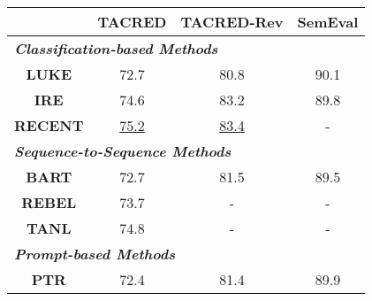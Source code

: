 \begin{table}[]
\centering
\setlength{\tabcolsep}{1.3mm}
\begin{tabular}{cccc}
\toprule[1.5pt]
\multicolumn{1}{l|}{}                         & \multicolumn{1}{l|}{\textbf{TACRED}}     & \multicolumn{1}{l|}{\textbf{TACRED-Rev}} & \multicolumn{1}{l}{\textbf{SemEval}} \\ \hline
\multicolumn{4}{l}{\textit{\textbf{Classification-based Methods}}}                                                                                                                 \\ \hline
\multicolumn{1}{c|}{\textbf{LUKE}}            & \multicolumn{1}{c|}{72.7}                & \multicolumn{1}{c|}{80.8}                    & 90.1                                    \\
\multicolumn{1}{c|}{\textbf{IRE}}             & \multicolumn{1}{c|}{74.6}                & \multicolumn{1}{c|}{83.2}                    & 89.8                                     \\
\multicolumn{1}{c|}{\textbf{RECENT}} & \multicolumn{1}{c|}{\underline{75.2}}          & \multicolumn{1}{c|}{\underline{83.4}}              & -                                        \\ \hline
\multicolumn{4}{l}{\textit{\textbf{Sequence-to-Sequence Methods}}}                                                                                                                 \\ \hline
\multicolumn{1}{c|}{\textbf{BART}}           & \multicolumn{1}{c|}{72.7}                & \multicolumn{1}{c|}{81.5}                       & \multicolumn{1}{c}{89.5}                                        \\
\multicolumn{1}{c|}{\textbf{REBEL}}           & \multicolumn{1}{c|}{73.7}                & \multicolumn{1}{c|}{-}                       & -                                        \\
\multicolumn{1}{c|}{\textbf{TANL}}            & \multicolumn{1}{c|}{74.8}                & \multicolumn{1}{c|}{-}                       & -                                        \\ \hline
\multicolumn{4}{l}{\textit{\textbf{Prompt-based Methods}}}                                                                                                                         \\ \hline
\multicolumn{1}{c|}{\textbf{PTR}}             & \multicolumn{1}{c|}{72.4}                & \multicolumn{1}{c|}{81.4}                    & \multicolumn{1}{c}{89.9}                                       \\

\end{tabular}
\end{table}
